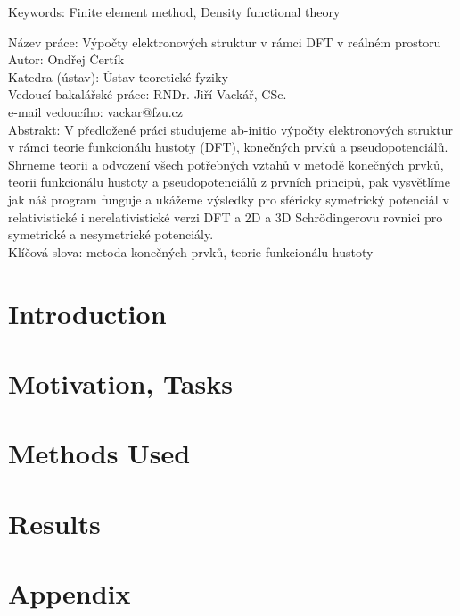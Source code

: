 \documentclass[12pt,notitlepage]{report}
\begin{document}
\noindent Keywords: Finite element method, Density functional theory

\vspace{10mm}

\noindent
Název práce: Výpočty elektronových struktur v rámci DFT v reálném prostoru\\
Autor: Ondřej Čertík\\
Katedra (ústav): Ústav teoretické fyziky\\
Vedoucí bakalářské práce: RNDr. Jiří Vackář, CSc.\\
e-mail vedoucího: vackar@fzu.cz\\

\noindent Abstrakt:  V předložené práci studujeme ab-initio výpočty
elektronových struktur v rámci teorie funkcionálu hustoty (DFT), konečných
prvků a pseudopotenciálů. Shrneme teorii a odvození všech potřebných vztahů v
metodě konečných prvků, teorii funkcionálu hustoty a pseudopotenciálů z prvních
principů, pak vysvětlíme jak náš program funguje a ukážeme výsledky pro
sféricky symetrický potenciál v relativistické i nerelativistické verzi DFT a
2D a 3D Schrödingerovu rovnici pro symetrické a nesymetrické potenciály. \\

\noindent Klíčová slova: metoda konečných prvků, teorie funkcionálu hustoty

\tableofcontents %

\newpage

\chapter{Introduction}



\chapter{Motivation, Tasks}



\chapter{Methods Used}




\chapter{Results}



\chapter{Appendix}







\end{document}
